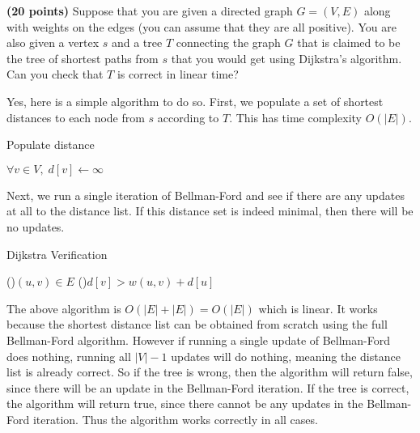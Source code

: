 \documentclass[11pt,letterpaper]{article}
\begin{document}
\pagebreak
\begin{problem}
    {\bf (20 points)} Suppose that you are given a directed graph $G=(V,E)$ along with weights on the edges (you can assume that they are all positive). You are also given a vertex $s$ and a tree $T$ connecting the graph $G$ that is claimed to be the tree of shortest paths from $s$ that you would get using Dijkstra's algorithm.  Can you check that $T$ is correct in linear time?
\end{problem} 


\begin{solution}
    Yes, here is a simple algorithm to do so. First, we populate a set of shortest distances to each node from $s$ according to $T$. This has time complexity $O(|E|)$. 
    \begin{algorithm}
        \caption{Populate distance}
        \DontPrintSemicolon
        $\forall v\in V,\;d[v]\leftarrow \infty$ 
    \end{algorithm}
    Next, we run a single iteration of Bellman-Ford and see if there are any updates at all to the distance list. If this distance set is indeed minimal, then there will be no updates.
    \begin{algorithm}
        \caption{Dijkstra Verification}
        \DontPrintSemicolon
        \;
        \For(){$(u,v)\in E$ }{
            \If(){$d[v] > w(u,v) + d[u]$}{
            }
        }
    \end{algorithm}
    The above algorithm is $O(|E|+|E|)=O(|E|)$ which is linear.
    It works because the shortest distance list can be obtained from scratch using the full Bellman-Ford algorithm. However if running a single update of Bellman-Ford does nothing, running all $|V|-1$ updates will do nothing, meaning the distance list is already correct. So if the tree is wrong, then the algorithm will return false, since there will be an update in the Bellman-Ford iteration. If the tree is correct, the algorithm will return true, since there cannot be any updates in the Bellman-Ford iteration. Thus the algorithm works correctly in all cases.
\end{solution}
\end{document}
